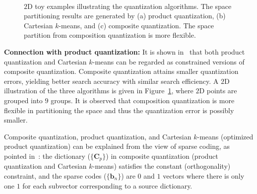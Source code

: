 \documentclass[10pt,journal,compsoc]{IEEEtran}
\begin{document}
\begin{figure}
\centering
{}~~~~
~~~~
\caption{$2$D toy examples illustrating the quantization algorithms.
The space partitioning results are
generated by (a) product quantization,
(b) Cartesian $k$-means,
and (c) composite quantization.
The space partition from composition quantization is more flexible. }
\label{fig:quantization}
\vspace{-.5cm}
\end{figure}


\textbf{Connection with product quantization:}
It is shown in~\cite{ZhangDW14}
that both product quantization and Cartesian $k$-means
can be regarded as constrained versions of composite quantization.
Composite quantization attains smaller quantization errors,
yielding better search accuracy
with similar search efficiency.
A $2$D illustration of the three algorithms is given
in Figure~\ref{fig:quantization},
where $2$D points are grouped
into $9$ groups.
It is observed that composition quantization
is more flexible in partitioning the space
and thus the quantization error is possibly smaller.


Composite quantization, product quantization, and Cartesian $k$-means (optimized product quantization)
can be explained from the view of sparse coding,
as pointed in~\cite{ZhangDW14, BabenkoK14,VedaldiZisserman12}:
the dictionary ($\{\mathbf{C}_p\}$) in
composite quantization (product quantization and Cartesian $k$-means)
satisfies the constant (orthogonality) constraint,
and the sparse codes ($\{\mathbf{b}_n\}$)
are $0$ and $1$ vectors
where there is only one $1$ for each subvector corresponding to a source dictionary.
\end{document}
